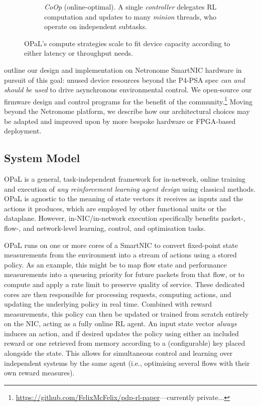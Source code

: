 \documentclass[sigconf,natbib=false]{acmart}
\newcommand{\approachshort}{OPaL}
\newcommand{\Coopfw}{\emph{CoOp}}
\begin{document}
\begin{figure}
\begin{subfigure}{0.45\linewidth}
		\caption{\Coopfw{} (online-optimal). A single \emph{controller} delegates RL computation and updates to many \emph{minion} threads, who operate on independent subtasks.\label{fig:single-and-parallel:parallel}}
	\end{subfigure}
	\caption{\approachshort{}'s compute strategies scale to fit device capacity according to either latency or throughput needs.\label{fig:single-and-parallel}}
\end{figure}

 outline our design and implementation on Netronome SmartNIC hardware in pursuit of this goal: unused device resources beyond the P4-PSA spec \emph{can and should be used} to drive asynchronous environmental control.
We open-source our firmware design and control programs for the benefit of the community.\footnote{\url{https://github.com/FelixMcFelix/pdp-rl-paper}---currently private...}
Moving beyond the Netronome platform, we describe how our architectural choices may be adapted and improved upon by more bespoke hardware or FPGA-based deployment.

\subsection{System Model}
\approachshort{} is a general, task-independent framework for in-network, online training and execution of \emph{any reinforcement learning agent design} using classical methods.
\approachshort{} is agnostic to the meaning of state vectors it receives as inputs and the actions it produces, which are employed by other functional units or the dataplane.
However, in-NIC/in-network execution specifically benefits packet-, flow-, and network-level learning, control, and optimisation tasks.

\approachshort{} runs on one or more cores of a SmartNIC to convert fixed-point state measurements from the environment into a stream of actions using a stored policy.
As an example, this might be to map flow state and performance measurements into a queueing priority for future packets from that flow, or to compute and apply a rate limit to preserve quality of service.
These dedicated cores are then responsible for processing requests, computing actions, and updating the underlying policy in real time.
Combined with reward measurements, this policy can then be updated or trained from scratch entirely on the NIC, acting as a fully online RL agent.
An input state vector \emph{always} induces an action, and if desired updates the policy using either an included reward or one retrieved from memory according to a (configurable) key placed alongside the state.
This allows for simultaneous control and learning over independent systems by the same agent (i.e., optimising several flows with their own reward measures).
\end{document}
